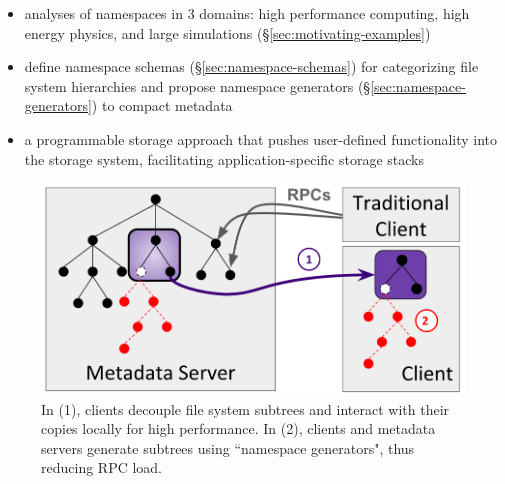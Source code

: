 \begin{itemize}
  \setlength\itemsep{-0.5em}

\item analyses of namespaces in 3 domains: high performance computing,
high energy physics, and large simulations (\S\ref{sec:motivating-examples})

\item define namespace schemas (\S\ref{sec:namespace-schemas}) for categorizing
file system hierarchies and propose namespace generators
(\S\ref{sec:namespace-generators}) to compact metadata

\item a programmable storage approach that pushes user-defined functionality
into the storage system, facilitating application-specific storage stacks

\end{itemize}

\begin{figure}[t]
  \centering
  \includegraphics[width=0.9\linewidth]{figures/intro.png}
  \caption{In (1), clients decouple file system subtrees and interact with
their copies locally for high performance. In (2), clients and metadata servers
generate subtrees using ``namespace generators", thus reducing RPC load.
\label{fig:intro}}
\end{figure}


